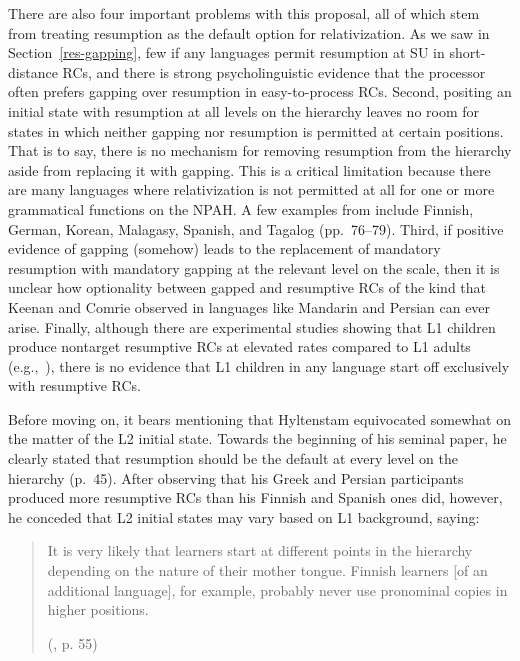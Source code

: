 There are also four important problems with this proposal, all of which stem from treating resumption as the default option for relativization. As we saw in Section~\ref{res-gapping}, few if any languages permit resumption at SU in short-distance RCs, and there is strong psycholinguistic evidence that the processor often prefers gapping over resumption in easy-to-process RCs. Second, positing an initial state with resumption at all levels on the hierarchy leaves no room for states in which neither gapping nor resumption is permitted at certain positions. That is to say, there is no mechanism for removing resumption from the hierarchy aside from replacing it with gapping. This is a critical limitation because there are many languages where relativization is not permitted at all for one or more grammatical functions on the NPAH. A few examples from \textcite{keenan.comrie1977} include Finnish, German, Korean, Malagasy, Spanish, and Tagalog (pp.~76--79). Third, if positive evidence of gapping (somehow) leads to the replacement of mandatory resumption with mandatory gapping at the relevant level on the scale, then it is unclear how optionality between gapped and resumptive RCs of the kind that Keenan and Comrie observed in languages like Mandarin and Persian can ever arise. Finally, although there are experimental studies showing that L1 children produce nontarget resumptive RCs at elevated rates compared to L1 adults (e.g.,~\cite{kim2013,labelle1990,perez-leroux1995,varlokosta.armon-lotem1998}), there is no evidence that L1 children in any language start off exclusively with resumptive RCs.

Before moving on, it bears mentioning that Hyltenstam equivocated somewhat on the matter of the L2 initial state. Towards the beginning of his seminal \citeyear{hyltenstam1984} paper, he clearly stated that resumption should be the default at every level on the hierarchy (p.~45). After observing that his Greek and Persian participants produced more resumptive RCs than his Finnish and Spanish ones did, however, he conceded that L2 initial states may vary based on L1 background, saying:

\begin{quote}\begin{samepage}
It is very likely that learners start at different points in the hierarchy depending on the nature of their mother tongue. Finnish learners [of an additional language], for example, probably never use pronominal copies in higher positions.
\par\nobreak\vspace{5pt}
\hfill(\cite{hyltenstam1984}, p. 55)\end{samepage}\end{quote}\vspace{-12pt}

